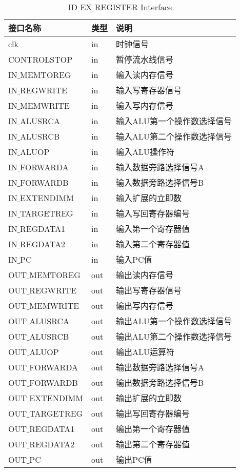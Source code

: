 \begin{table}[H]
\begin{center}
\renewcommand{\arraystretch}{1.3}
\small
\caption{ID$\_$EX$\_$REGISTER Interface}
\label{tab:treatments}
\begin{tabular}{|p{3cm}<{\centering}|p{1.4cm}<{\centering}|p{7cm}<{\centering}|}
\hline
接口名称 & 类型 & 说明 \\
\hline
clk & in & 时钟信号 \\
\hline
CONTROLSTOP & in & 暂停流水线信号 \\
\hline
IN$\_$MEMTOREG & in & 输入读内存信号 \\
\hline
IN$\_$REGWRITE & in & 输入写寄存器信号 \\
\hline
IN$\_$MEMWRITE & in & 输入写内存信号 \\
\hline
IN$\_$ALUSRCA & in & 输入ALU第一个操作数选择信号 \\
\hline
IN$\_$ALUSRCB & in & 输入ALU第二个操作数选择信号 \\
\hline
IN$\_$ALUOP & in & 输入ALU操作符 \\
\hline
IN$\_$FORWARDA & in & 输入数据旁路选择信号A \\
\hline
IN$\_$FORWARDB & in & 输入数据旁路选择信号B \\
\hline
IN$\_$EXTENDIMM & in & 输入扩展的立即数 \\
\hline
IN$\_$TARGETREG & in & 输入写回寄存器编号 \\
\hline
IN$\_$REGDATA1 & in & 输入第一个寄存器值 \\
\hline
IN$\_$REGDATA2 & in & 输入第二个寄存器值 \\
\hline
IN$\_$PC & in & 输入PC值 \\
\hline
OUT$\_$MEMTOREG & out & 输出读内存信号 \\
\hline
OUT$\_$REGWRITE & out & 输出写寄存器信号 \\
\hline
OUT$\_$MEMWRITE & out & 输出写内存信号 \\
\hline
OUT$\_$ALUSRCA & out & 输出ALU第一个操作数选择信号 \\
\hline
OUT$\_$ALUSRCB & out & 输出ALU第二个操作数选择信号 \\
\hline
OUT$\_$ALUOP & out & 输出ALU运算符  \\
\hline
OUT$\_$FORWARDA & out & 输出数据旁路选择信号A \\
\hline
OUT$\_$FORWARDB & out & 输出数据旁路选择信号B \\
\hline
OUT$\_$EXTENDIMM & out & 输出扩展的立即数 \\
\hline
OUT$\_$TARGETREG & out & 输出写回寄存器编号 \\
\hline
OUT$\_$REGDATA1 & out & 输出第一个寄存器值 \\
\hline
OUT$\_$REGDATA2 & out & 输出第二个寄存器值 \\
\hline
OUT$\_$PC & out & 输出PC值 \\
\hline
\end{tabular}
\end{center}
\end{table}

